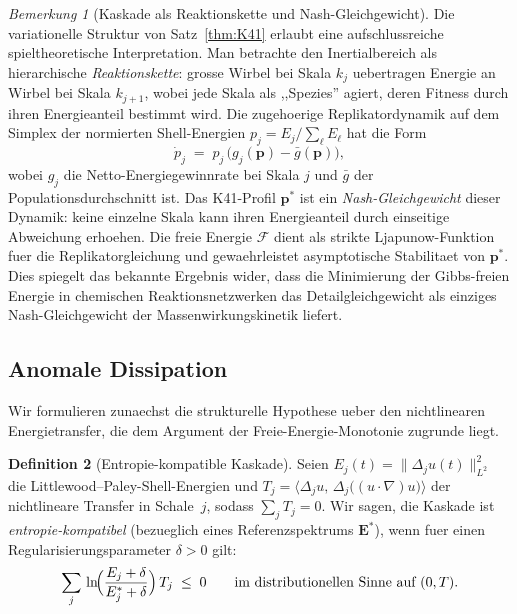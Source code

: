 \documentclass[12pt,a4paper]{article}
\theoremstyle{definition}
\newtheorem{definition}{Definition}[section]
\theoremstyle{plain}
\theoremstyle{remark}
\newtheorem{remark}[definition]{Bemerkung}
\begin{document}
\begin{remark}[Kaskade als Reaktionskette und Nash-Gleichgewicht]\label{rem:nash}
Die variationelle Struktur von Satz~\ref{thm:K41} erlaubt eine aufschlussreiche
spieltheoretische Interpretation. Man betrachte den Inertialbereich als
hierarchische \emph{Reaktionskette}: grosse Wirbel bei Skala $k_j$ uebertragen
Energie an Wirbel bei Skala $k_{j+1}$, wobei jede Skala als ,,Spezies'' agiert,
deren Fitness durch ihren Energieanteil bestimmt wird. Die zugehoerige
Replikatordynamik auf dem Simplex der normierten Shell-Energien
$p_j = E_j / \sum_\ell E_\ell$ hat die Form
\[
  \dot{p}_j
  \;=\;
  p_j\,\bigl(g_j(\mathbf{p}) - \bar{g}(\mathbf{p})\bigr),
\]
wobei $g_j$ die Netto-Energiegewinnrate bei Skala $j$ und $\bar{g}$ der
Populationsdurchschnitt ist. Das K41-Profil $\mathbf{p}^*$ ist ein
\emph{Nash-Gleichgewicht} dieser Dynamik: keine einzelne Skala kann ihren
Energieanteil durch einseitige Abweichung erhoehen. Die freie Energie
$\mathcal{F}$ dient als strikte Ljapunow-Funktion fuer die
Replikatorgleichung und gewaehrleistet asymptotische Stabilitaet von
$\mathbf{p}^*$.
Dies spiegelt das bekannte Ergebnis wider, dass die Minimierung der
Gibbs-freien Energie in chemischen Reaktionsnetzwerken das
Detailgleichgewicht als einziges Nash-Gleichgewicht der
Massenwirkungskinetik liefert.
\end{remark}

\subsection{Anomale Dissipation}

Wir formulieren zunaechst die strukturelle Hypothese ueber den nichtlinearen
Energietransfer, die dem Argument der Freie-Energie-Monotonie zugrunde liegt.

\begin{definition}[Entropie-kompatible Kaskade]\label{def:NL}
Seien $E_j(t) = \|\Delta_j u(t)\|_{L^2}^2$ die Littlewood--Paley-Shell-Energien
und $T_j = \langle \Delta_j u,\, \Delta_j\bigl((u\cdot\nabla)u\bigr)\rangle$
der nichtlineare Transfer in Schale~$j$, sodass $\sum_j T_j = 0$.
Wir sagen, die Kaskade ist \emph{entropie-kompatibel} (bezueglich eines
Referenzspektrums $\mathbf{E}^*$), wenn fuer einen
Regularisierungsparameter $\delta > 0$ gilt:
\begin{equation}\label{eq:NL}
  \sum_{j}\,\ln\!\Bigl(\frac{E_j + \delta}{E_j^* + \delta}\Bigr)\,T_j
  \;\le\; 0
  \qquad \text{im distributionellen Sinne auf } (0,T).
\end{equation}
\end{definition}
\end{document}

